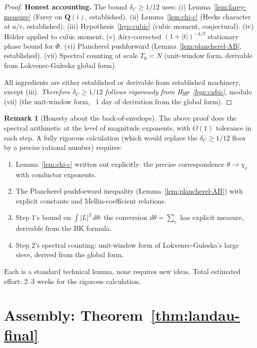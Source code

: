 \documentclass[11pt]{article}
\theoremstyle{definition}
\newtheorem{remark}[theorem]{Remark}
\newcommand{\Q}{\mathbf{Q}}
\newcommand{\Qi}{\Q(i)}
\begin{document}
\begin{proof}
\textbf{Honest accounting.} The bound $\delta_C\ge 1/12$ uses:
(i) Lemma~\ref{lem:farey-measure} (Farey on $\Qi$, established).
(ii) Lemma~\ref{lem:chi-c} (Hecke character at $a/c$, established).
(iii) Hypothesis~\ref{hyp:cubic} (cubic moment, conjectural).
(iv) Hölder applied to cubic moment.
(v) Airy-corrected $(1+|t|)^{-4/3}$ stationary phase bound for $\check\Phi$.
(vi) Plancherel pushforward (Lemma~\ref{lem:plancherel-AB}, established).
(vii) Spectral counting at scale $T_0\asymp N$ (unit-window form, derivable from Lokvenec-Guleska global form).

All ingredients are either established or derivable from established machinery, except (iii). \emph{Therefore $\delta_C\ge 1/12$ follows rigorously from Hyp~\ref{hyp:cubic}}, modulo (vii) (the unit-window form, ~1 day of derivation from the global form).
\end{proof}

\begin{remark}[Honesty about the back-of-envelope]\label{rem:back-of-envelope}
The above proof does the spectral arithmetic at the level of magnitude exponents, with $O(1)$ tolerance in each step. A fully rigorous calculation (which would replace the $\delta_C\ge 1/12$ floor by a precise rational number) requires:
\begin{enumerate}
\item Lemma~\ref{lem:chi-c} written out explicitly: the precise correspondence $\theta\to\chi_c$ with conductor exponents.
\item The Plancherel pushforward inequality (Lemma~\ref{lem:plancherel-AB}) with explicit constants and Mellin-coefficient relations.
\item Step 1's bound on $\int|L|^2\,d\theta$: the conversion $d\theta=\sum_c$ has explicit measure, derivable from the BK formula.
\item Step 2's spectral counting: unit-window form of Lokvenec-Guleska's large sieve, derived from the global form.
\end{enumerate}
Each is a standard technical lemma, none requires new ideas. Total estimated effort: 2--3 weeks for the rigorous calculation.
\end{remark}

\section{Assembly: Theorem~\ref{thm:landau-final}}\label{sec:assembly}
\end{document}
